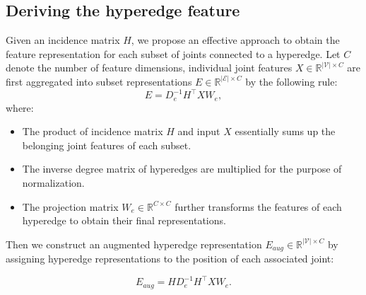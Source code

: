 \documentclass[10pt,twocolumn,letterpaper]{article}
\begin{document}
\subsection{Deriving the hyperedge feature}

Given an incidence matrix $H$, we propose an effective approach to obtain the feature representation for each subset of joints connected to a hyperedge. 
Let $C$ denote the number of feature dimensions, individual joint features $X \in \mathbb{R}^{\vert \mathcal{V} \vert \times C}$ are first aggregated into subset representations $E \in \mathbb{R}^{ \vert \mathcal{E} \vert \times C}$ by the following rule:
\begin{equation}
\label{eq:4}
     E = D_e^{-1}H^\top XW_{e},
\end{equation}
where:
\begin{itemize}
    \item The product of incidence matrix $H$ and input $X$ essentially sums up the belonging joint features of each subset. 
    \item The inverse degree matrix of hyperedges are multiplied for the purpose of normalization. 
    \item The projection matrix $W_{e} \in \mathbb{R}^{C\times C}$ further transforms the features of each hyperedge to obtain their final representations.
\end{itemize}
 

Then we construct an augmented hyperedge representation $E_{aug} \in \mathbb{R}^{ \vert \mathcal{V} \vert \times C}$ by assigning hyperedge representations to the position of each associated joint:

\begin{equation}
\label{eq:5}
    E_{aug} = HD_e^{-1}H^\top XW_{e}.
\end{equation}
\end{document}
